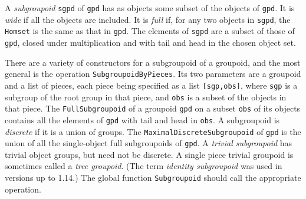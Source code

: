 \documentclass[a4paper,11pt]{report}
\begin{document}
{{{ A \emph{subgroupoid} \texttt{sgpd} of \texttt{gpd} has as objects some subset of the objects of \texttt{gpd}. It is \emph{wide} if all the objects are included. It is \emph{full} if, for any two objects in \texttt{sgpd}, the \texttt{Homset} is the same as that in \texttt{gpd}. The elements of \texttt{sgpd} are a subset of those of \texttt{gpd}, closed under multiplication and with tail and head in the chosen object set. 

 There are a variety of constructors for a subgroupoid of a groupoid, and the
most general is the operation \texttt{SubgroupoidByPieces}. Its two parameters are a groupoid and a list of pieces, each piece being
specified as a list \texttt{[sgp,obs]}, where \texttt{sgp} is a subgroup of the root group in that piece, and \texttt{obs} is a subset of the objects in that piece. The \texttt{FullSubgroupoid} of a groupoid \texttt{gpd} on a subset \texttt{obs} of its objects contains all the elements of \texttt{gpd} with tail and head in \texttt{obs}. A subgroupoid is \emph{discrete} if it is a union of groups. The \texttt{MaximalDiscreteSubgroupoid} of \texttt{gpd} is the union of all the single-object full subgroupoids of \texttt{gpd}. A  \emph{trivial subgroupoid} has trivial object groups, but need not be discrete. A single piece trivial
groupoid is sometimes called a  \emph{tree groupoid}. (The term  \emph{identity subgroupoid} was used in versions up to 1.14.) The global function \texttt{Subgroupoid} should call the appropriate operation. 

 }

 
\begin{Verbatim}[commandchars=!@|,fontsize=\small,frame=single,label=Example]
  

\end{Verbatim}}}
\end{document}
